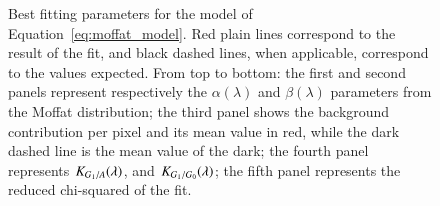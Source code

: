 \begin{figure}[h]
     \centering
     \caption{Best fitting parameters for the model of Equation~\ref{eq:moffat_model}. Red plain lines correspond to the result of the fit, and black dashed lines, when applicable, correspond to the values expected. From top to bottom: the first and second panels represent respectively the $\alpha(\lambda)$ and $\beta(\lambda)$ parameters from the Moffat distribution; the third panel shows the background contribution per pixel and its mean value in red, while the dark dashed line is the mean value of the dark; the fourth panel represents $K_{G_1/A}(\lambda)$, and $K_{G_1/G_0}(\lambda)$; the fifth panel represents the reduced chi-squared of the fit.}
     \label{fig:result_params}
\end{figure}

%
%
%
%

